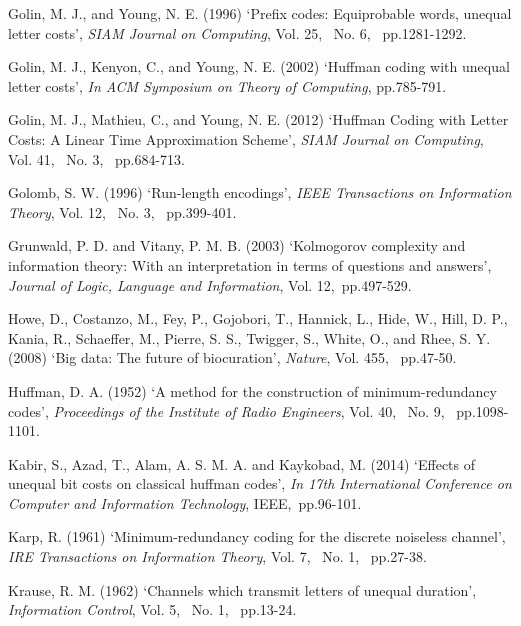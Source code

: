 \documentclass{singlecol-new}
\theoremstyle{TH}{
\newtheorem{lemma}{Lemma}
\newtheorem{theorem}[lemma]{Theorem}
\newtheorem{corrolary}[lemma]{Corrolary}
\newtheorem{conjecture}[lemma]{Conjecture}
\newtheorem{proposition}[lemma]{Proposition}
\newtheorem{claim}[lemma]{Claim}
\newtheorem{stheorem}[lemma]{Wrong Theorem}
}
\theoremstyle{THrm}{
\newtheorem{definition}{Definition}
\newtheorem{question}{Question}
\newtheorem{remark}{Remark}
\newtheorem{scheme}{Scheme}
}
\theoremstyle{THhit}{
\newtheorem{case}{Case}[section]
}
\begin{document}
\begin{thebibliography}{99}
Golin, M. J., and Young, N. E. (1996) `Prefix codes:
Equiprobable words, unequal letter costs', {\it SIAM Journal on Computing}, Vol. 25,~ No. 6,~ pp.1281-1292.

Golin, M. J., Kenyon, C., and Young, N. E. (2002) `Huffman coding with unequal letter costs', {\it In
ACM Symposium on Theory of Computing}, pp.785-791.

Golin, M. J., Mathieu, C., and Young, N. E. (2012) `Huffman Coding with Letter Costs: A Linear Time Approximation Scheme', {\it SIAM Journal
on Computing}, Vol. 41,~ No. 3, ~pp.684-713.

 Golomb, S. W. (1996) `Run-length encodings',  {\it IEEE Transactions on Information Theory}, Vol. 12,~ No. 3,~ pp.399-401.

Grunwald, P. D. and Vitany, P. M. B. (2003) `Kolmogorov complexity and information theory:
With an interpretation in terms of questions
and answers', {\it Journal of Logic, Language
and Information}, Vol. 12,~pp.497-529.

Howe, D., Costanzo,  M., Fey, P., Gojobori, T., 
Hannick, L., Hide, W., Hill, D. P., Kania, R., Schaeffer,  M., Pierre,   S. S., Twigger,  S., White, O., and Rhee, S. Y. (2008) `Big data: The
future of biocuration', {\it Nature}, Vol. 455,~ pp.47-50.

Huffman, D. A. (1952) `A method for the construction
of minimum-redundancy codes', {\it Proceedings
of the Institute of Radio Engineers}, Vol. 40,~ No. 9,~ pp.1098-1101.

Kabir, S., Azad, T., Alam, A. S. M. A. and Kaykobad, M. (2014) `Effects of unequal bit costs
on classical huffman codes', {\it In 17th International Conference on Computer and Information Technology}, IEEE,~pp.96-101.

Karp, R. (1961) `Minimum-redundancy coding for the
discrete noiseless channel', {\it IRE Transactions on Information Theory}, Vol. 7,~ No. 1,~ pp.27-38.

Krause, R. M. (1962) `Channels which transmit letters
of unequal duration', {\it Information Control}, Vol. 5,~ No. 1,~ pp.13-24.


\end{thebibliography}
\end{document}
